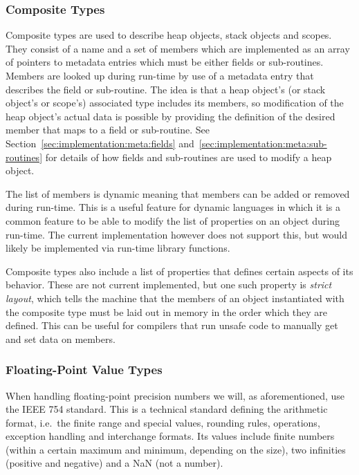 
\subsubsection{Composite Types}

Composite types are used to describe heap objects, stack objects and
scopes. They consist of a name and a set of members which are implemented as an
array of pointers to metadata entries which must be either fields or
sub-routines. Members are looked up during run-time by use of a metadata entry
that describes the field or sub-routine. The idea is that a heap object's (or
stack object's or scope's) associated type includes its members, so modification
of the heap object's actual data is possible by providing the definition of the
desired member that maps to a field or sub-routine. See
Section~\ref{sec:implementation:meta:fields}
and~\ref{sec:implementation:meta:sub-routines} for details of how fields and
sub-routines are used to modify a heap object.

The list of members is dynamic meaning that members can be added or removed
during run-time. This is a useful feature for dynamic languages in which it is a
common feature to be able to modify the list of properties on an object during
run-time. The current implementation however does not support this, but would
likely be implemented via run-time library functions.

Composite types also include a list of properties that defines certain aspects
of its behavior. These are not current implemented, but one such property is
{\em strict layout}, which tells the machine that the members of an object
instantiated with the composite type must be laid out in memory in the order
which they are defined. This can be useful for compilers that run unsafe code to
manually get and set data on members.

\subsubsection{Floating-Point Value Types}

When handling floating-point precision numbers we will, as aforementioned, use
the IEEE 754 standard\cite{ieee754}. This is a technical standard defining the
arithmetic format, i.e.~the finite range and special values, rounding rules,
operations, exception handling and interchange formats. Its values include
finite numbers (within a certain maximum and minimum, depending on the size),
two infinities (positive and negative) and a NaN (not a number).

